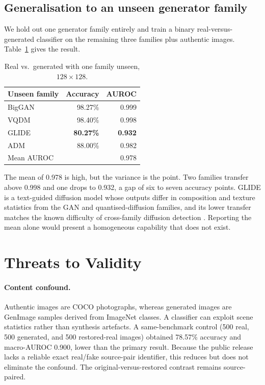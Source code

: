 \documentclass[runningheads]{llncs}
\newcommand{\best}[1]{\textbf{#1}}
\begin{document}
\subsection{Generalisation to an unseen generator family}

We hold out one generator family entirely and train a binary real-versus-generated
classifier on the remaining three families plus authentic images.
Table~\ref{tab:unseen} gives the result.

\begin{table}[t]
\centering
\caption{Real vs.\ generated with one family unseen, $128\times128$.}
\label{tab:unseen}
\begin{tabular}{@{}lrr@{}}
\toprule
Unseen family & Accuracy & AUROC \\
\midrule
BigGAN & 98.27\% & 0.999 \\
VQDM   & 98.40\% & 0.998 \\
GLIDE  & \best{80.27\%} & \best{0.932} \\
ADM    & 88.00\% & 0.982 \\
\midrule
Mean AUROC & & 0.978 \\
\bottomrule
\end{tabular}
\end{table}

The mean of 0.978 is high, but the variance is the point. Two families transfer
above 0.998 and one drops to 0.932, a gap of six to seven accuracy points. GLIDE is
a text-guided diffusion model whose outputs differ in composition and texture
statistics from the GAN and quantised-diffusion families, and its lower transfer
matches the known difficulty of cross-family diffusion detection
\cite{corvi2023diffusion,ojha2023univfd}. Reporting the mean alone would present a
homogeneous capability that does not exist.

\section{Threats to Validity}
\label{sec:threats}

\paragraph{Content confound.} Authentic images are COCO photographs, whereas
generated images are GenImage samples derived from ImageNet classes. A classifier
can exploit scene statistics rather than synthesis artefacts. A same-benchmark
control (500 real, 500 generated, and 500 restored-real images) obtained 78.57\%
accuracy and macro-AUROC 0.900, lower than the primary result. Because the public
release lacks a reliable exact real/fake source-pair identifier, this reduces but
does not eliminate the confound. The original-versus-restored contrast remains
source-paired.
\end{document}

